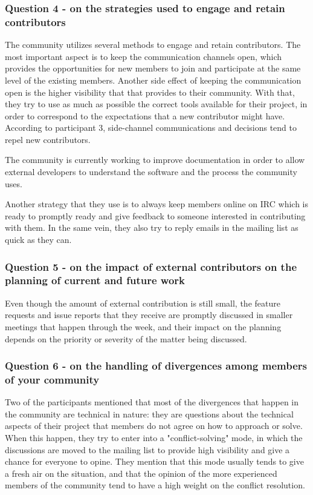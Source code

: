 \documentclass{sigchi}
\begin{document}
\subsubsection{Question 4 - on the strategies used to engage and retain contributors}

The community utilizes several methods to engage and retain contributors. The most important aspect is to keep the communication channels open, which provides the opportunities for new members to join and participate at the same level of the existing members. Another side effect of keeping the communication open is the higher visibility that that provides to their community. With that, they try to use as much as possible the correct tools available for their project, in order to correspond to the expectations that a new contributor might have. According to participant 3, side-channel communications and decisions tend to repel new contributors.

The community is currently working to improve documentation in order to allow external developers to understand the software and the process the community uses.

Another strategy that they use is to always keep members online on IRC which is ready to promptly ready and give feedback to someone interested in contributing with them. In the same vein, they also try to reply emails in the mailing list as quick as they can.

\subsubsection{Question 5 - on the impact of external contributors on the planning of current and future work}

Even though the amount of external contribution is still small, the feature requests and issue reports that they receive are promptly discussed in smaller meetings that happen through the week, and their impact on the planning depends on the priority or severity of the matter being discussed.

\subsubsection{Question 6 - on the handling of divergences among members of your community}
Two of the participants mentioned that most of the divergences that happen in the community are technical in nature: they are questions about the technical aspects of their project that members do not agree on how to approach or solve. When this happen, they try to enter into a "conflict-solving" mode, in which the discussions are moved to the mailing list to provide high visibility and give a chance for everyone to opine. They mention that this mode usually tends to give a fresh air on the situation, and that the opinion of the more experienced members of the community tend to have a high weight on the conflict resolution.
\end{document}
